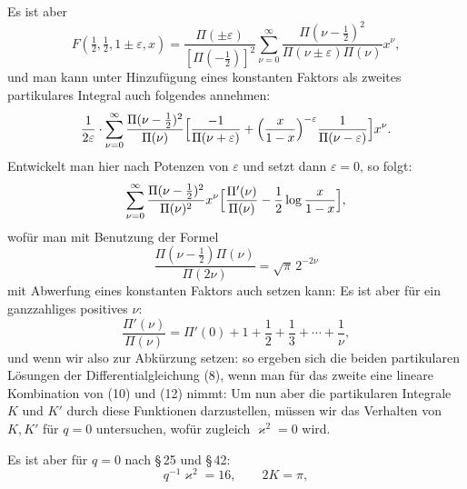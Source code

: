 
Es ist aber
\[
F(\tfrac12,\tfrac12,1\pm\varepsilon,x) = \frac{\Pi(\pm\varepsilon)}{[\Pi(-\tfrac12)]^2} \sum_{\nu=0}^{\infty} \frac{\Pi(\nu-\tfrac12)^2}{\Pi(\nu\pm\varepsilon)\Pi(\nu)} x^\nu,
\]
und man kann unter Hinzufügung eines konstanten Faktors als
zweites partikulares Integral auch folgendes annehmen:
\[
\frac{1}{2\varepsilon}\cdot\sum_{\nu=0}^{\infty} \frac{\Pi(\nu-\tfrac12)^2}{\Pi(\nu)}\Bigl[\frac{-1}{\Pi(\nu+\varepsilon)} + \Bigl(\frac{x}{1-x}\Bigr)^{-\varepsilon}\frac{1}{\Pi(\nu-\varepsilon)}\Bigr]x^\nu.
\]
Entwickelt man hier nach Potenzen von $\varepsilon$ und setzt dann
$\varepsilon=0$, so folgt:
\[
\sum_{\nu=0}^{\infty} \frac{\Pi(\nu-\tfrac12)^2}{\Pi(\nu)^2} x^\nu \Bigl[\frac{\Pi'(\nu)}{\Pi(\nu)} - \frac12 \log\frac{x}{1-x}\Bigr],
\]
wofür man mit Benutzung der  Formel
\[
\frac{\Pi(\nu-\tfrac12)\Pi(\nu)}{\Pi(2\nu)} = \sqrt{\pi}\,2^{-2\nu}
\]
mit Abwerfung eines konstanten Faktors auch setzen kann:
Es ist aber für ein ganzzahliges positives $\nu$:
\[
\frac{\Pi'(\nu)}{\Pi(\nu)} = \Pi'(0) + 1 + \frac12 + \frac13 + \cdots + \frac1\nu,
\]
und wenn wir also zur Abkürzung setzen:
so ergeben sich die beiden partikularen Lösungen der Differentialgleichung
 (8), wenn man für das zweite eine lineare Kombination
von (10) und (12) nimmt:
Um nun aber die partikularen Integrale $K$ und $K'$ durch
diese Funktionen darzustellen, müssen wir das Verhalten von $K,K'$
für $q=0$ untersuchen, wofür zugleich $\varkappa^2=0$ wird.

Es ist aber für $q=0$ nach \S\,25 und \S\,42:
\[
q^{-1}\varkappa^2 = 16, \qquad 2K = \pi,
\]
